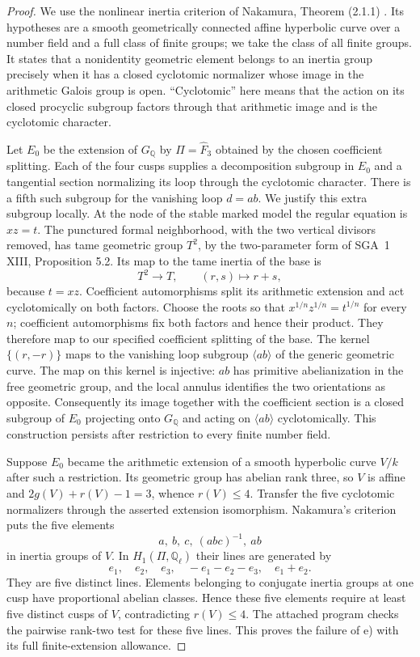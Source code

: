 \begin{proof}
We use the nonlinear inertia criterion of Nakamura,
Theorem (2.1.1) \cite{CF_Nakamura1994}. Its hypotheses are a smooth
geometrically connected affine hyperbolic curve over a number field
and a full class of finite groups; we take the class of all finite
groups. It states that a nonidentity geometric element belongs to
an inertia group precisely when it has a closed cyclotomic normalizer
whose image in the arithmetic Galois group is open. ``Cyclotomic''
here means that the action on its closed procyclic subgroup factors
through that arithmetic image and is the cyclotomic character.

Let $E_0$ be the extension of $G_{\mathbb Q}$ by $\Pi=\widehat F_3$
obtained by the chosen coefficient splitting. Each of the four
cusps supplies a decomposition subgroup in $E_0$ and a tangential
section normalizing its loop through the cyclotomic character.
There is a fifth such subgroup for the vanishing loop $d=ab$.
We justify this extra subgroup locally. At the node of the stable
marked model the regular equation is $xz=t$. The punctured formal
neighborhood, with the two vertical divisors removed, has tame
geometric group $T^2$, by the two-parameter form of SGA~1 XIII,
Proposition 5.2. Its map to the tame inertia of the base is
\[
 T^2\longrightarrow T,\qquad (r,s)\longmapsto r+s,
\]
because $t=xz$. Coefficient automorphisms split its arithmetic
extension and act cyclotomically on both factors. Choose the roots
so that $x^{1/n}z^{1/n}=t^{1/n}$ for every $n$; coefficient
automorphisms fix both factors and hence their product. They
therefore map to our specified coefficient splitting of the base. The kernel
$\{(r,-r)\}$ maps to the vanishing loop subgroup $\langle ab\rangle$
of the generic geometric curve. The map on this kernel is injective:
$ab$ has primitive abelianization in the free geometric group, and
the local annulus identifies the two orientations as opposite.
Consequently its image together with the coefficient section is a
closed subgroup of $E_0$ projecting onto $G_{\mathbb Q}$ and acting
on $\langle ab\rangle$ cyclotomically. This construction persists
after restriction to every finite number field.

Suppose $E_0$ became the arithmetic extension of a smooth hyperbolic
curve $V/k$ after such a restriction. Its geometric group has
abelian rank three, so $V$ is affine and
$2g(V)+r(V)-1=3$, whence $r(V)\leq4$. Transfer the five cyclotomic
normalizers through the asserted extension isomorphism. Nakamura's
criterion puts the five elements
\[
 a,\ b,\ c,\ (abc)^{-1},\ ab
\]
in inertia groups of $V$. In $H_1(\Pi,\mathbb Q_\ell)$ their lines
are generated by
\[
 e_1,\quad e_2,\quad e_3,\quad-e_1-e_2-e_3,\quad e_1+e_2.
\]
They are five distinct lines. Elements belonging to conjugate
inertia groups at one cusp have proportional abelian classes.
Hence these five elements require at least five distinct cusps of
$V$, contradicting $r(V)\leq4$. The attached program checks the
pairwise rank-two test for these five lines. This proves the failure
of e) with its full finite-extension allowance.
\end{proof}

